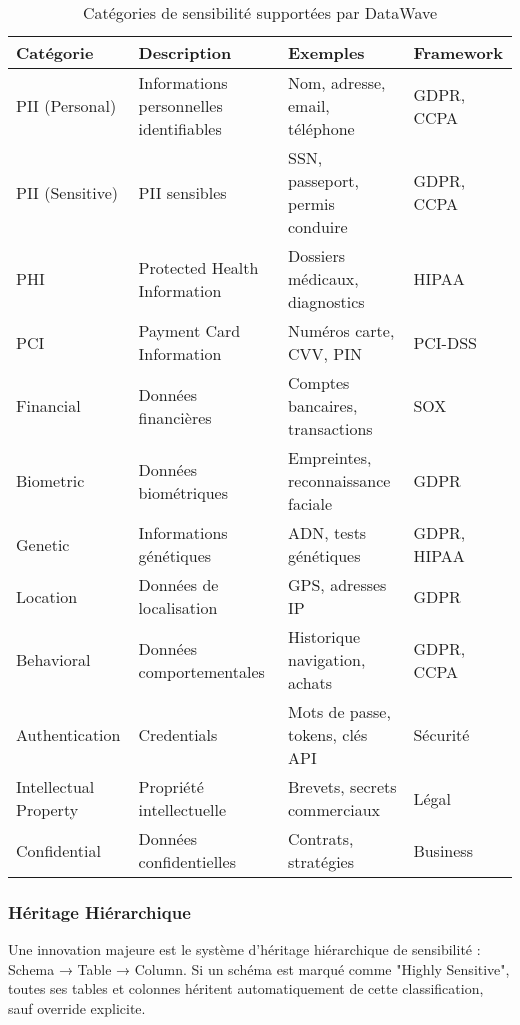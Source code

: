 \begin{table}[htpb]
\centering
\caption{Catégories de sensibilité supportées par DataWave}
\label{tab:categories_sensibilite}
\begin{tabular}{|p{}|p{}|p{}|p{}|}
\hline
\textbf{Catégorie} & \textbf{Description} & \textbf{Exemples} & \textbf{Framework} \\
\hline
PII (Personal) & Informations personnelles identifiables & Nom, adresse, email, téléphone & GDPR, CCPA \\
\hline
PII (Sensitive) & PII sensibles & SSN, passeport, permis conduire & GDPR, CCPA \\
\hline
PHI & Protected Health Information & Dossiers médicaux, diagnostics & HIPAA \\
\hline
PCI & Payment Card Information & Numéros carte, CVV, PIN & PCI-DSS \\
\hline
Financial & Données financières & Comptes bancaires, transactions & SOX \\
\hline
Biometric & Données biométriques & Empreintes, reconnaissance faciale & GDPR \\
\hline
Genetic & Informations génétiques & ADN, tests génétiques & GDPR, HIPAA \\
\hline
Location & Données de localisation & GPS, adresses IP & GDPR \\
\hline
Behavioral & Données comportementales & Historique navigation, achats & GDPR, CCPA \\
\hline
Authentication & Credentials & Mots de passe, tokens, clés API & Sécurité \\
\hline
Intellectual Property & Propriété intellectuelle & Brevets, secrets commerciaux & Légal \\
\hline
Confidential & Données confidentielles & Contrats, stratégies & Business \\
\hline
\end{tabular}
\end{table}

\subsubsection{Héritage Hiérarchique}

Une innovation majeure est le système d'héritage hiérarchique de sensibilité : Schema → Table → Column. Si un schéma est marqué comme "Highly Sensitive", toutes ses tables et colonnes héritent automatiquement de cette classification, sauf override explicite.


